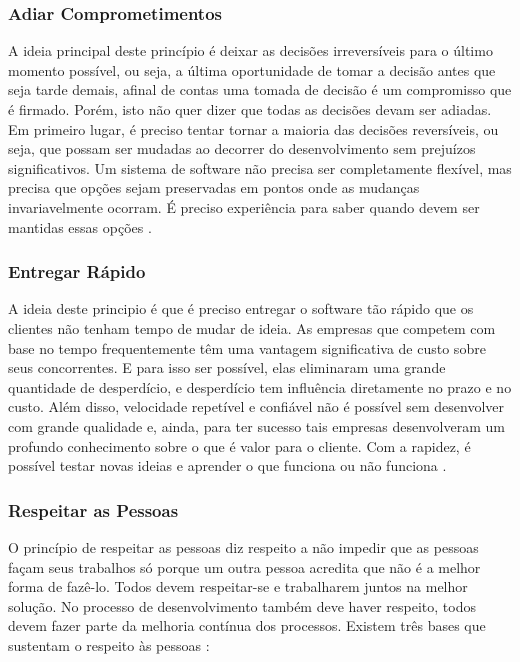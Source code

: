 \subsubsection[Adiar Comprometimentos]{Adiar Comprometimentos}

A ideia principal deste princípio é deixar as decisões irreversíveis para o último momento possível, ou seja, a última oportunidade de tomar a decisão antes que seja tarde demais, afinal de contas uma tomada de decisão é um compromisso que é firmado. Porém, isto não quer dizer que todas as decisões devam ser adiadas. Em primeiro lugar, é preciso tentar tornar a maioria das decisões reversíveis, ou seja, que possam ser mudadas ao decorrer do desenvolvimento sem prejuízos significativos. Um sistema de software não precisa ser completamente flexível, mas precisa que opções sejam preservadas em pontos onde as mudanças invariavelmente ocorram. É preciso experiência para saber quando devem ser mantidas essas opções  \cite{poppendieck}.

\subsubsection[Entregar Rápido]{Entregar Rápido}

A ideia deste principio é que é preciso entregar o software tão rápido que os clientes não tenham tempo de mudar de ideia.  As empresas que competem com base no tempo frequentemente têm uma vantagem significativa de custo sobre seus concorrentes. E para isso ser possível, elas eliminaram uma grande quantidade de desperdício, e desperdício tem influência diretamente no prazo e no custo. Além disso, velocidade repetível e confiável não é possível sem desenvolver com grande qualidade e, ainda, para ter sucesso tais empresas desenvolveram um profundo conhecimento sobre o que é valor para o cliente. Com a rapidez, é possível testar novas ideias e aprender o que funciona ou não funciona  \cite{poppendieck}. 

\subsubsection[Respeitar as Pessoas]{Respeitar as Pessoas}

O princípio de respeitar as pessoas diz respeito a não impedir que as pessoas façam seus trabalhos só porque um outra pessoa acredita que não é a melhor forma de fazê-lo. Todos devem respeitar-se e trabalharem juntos na melhor solução. No processo de desenvolvimento também deve haver respeito, todos devem fazer parte da melhoria contínua dos processos. Existem três bases que sustentam o respeito às pessoas  \cite{poppendieck}:

